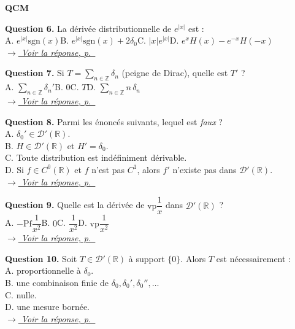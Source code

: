 \documentclass[12pt,a4paper,openany]{book}
\theoremstyle{definition}
\theoremstyle{plain}
\theoremstyle{remark}
\newenvironment{qcmblock}{%
	\begin{mdframed}[linewidth=0.5pt, linecolor=black!35,
		backgroundcolor=gray!5,
		skipabove=12pt, skipbelow=12pt,
		innerleftmargin=12pt, innerrightmargin=8pt,
		innertopmargin=8pt, innerbottommargin=8pt]%
		\noindent\textbf{\scshape QCM}\par\smallskip%
	}{%
	\end{mdframed}%
}
\newcommand{\navtoQCMRep}[2]{%
	\vspace{2pt}%
	\noindent\hfill{\small\itshape%
		\hyperlink{qcmrep:#1:q#2}{$\rightarrow$ Voir la réponse, p.~\pageref*{qcmrep:#1:q#2}}%
	}%
	\vspace{6pt}%
}
\begin{document}
\begin{qcmblock}
		\medskip
		\hypertarget{qcm:ch3:q6}{}\label{qcm:ch3:q6}
		\textbf{Question 6.} La dérivée distributionnelle de $e^{|x|}$ est :\\
		A. $e^{|x|}\mathrm{sgn}(x)$\quad B. $e^{|x|}\mathrm{sgn}(x) + 2\delta_0$\quad C. $|x|e^{|x|}$\quad D. $e^x H(x) - e^{-x}H(-x)$\\
		\navtoQCMRep{ch3}{6}
		
		\medskip
		\hypertarget{qcm:ch3:q7}{}\label{qcm:ch3:q7}
		\textbf{Question 7.} Si $T = \displaystyle\sum_{n \in \mathbb{Z}} \delta_n$ (peigne de Dirac), quelle est $T'$ ?\\
		A. $\displaystyle\sum_{n\in\mathbb{Z}}\delta_n'$\quad B. $0$\quad C. $T$\quad D. $\displaystyle\sum_{n\in\mathbb{Z}} n\,\delta_n$\\
		\navtoQCMRep{ch3}{7}
		
		\medskip
		\hypertarget{qcm:ch3:q8}{}\label{qcm:ch3:q8}
		\textbf{Question 8.} Parmi les énoncés suivants, lequel est \emph{faux} ?\\
		A. $\delta_0' \in \mathcal{D}'(\mathbb{R})$.\\
		B. $H \in \mathcal{D}'(\mathbb{R})$ et $H' = \delta_0$.\\
		C. Toute distribution est indéfiniment dérivable.\\
		D. Si $f \in C^0(\mathbb{R})$ et $f$ n'est pas $C^1$, alors $f'$ n'existe pas dans $\mathcal{D}'(\mathbb{R})$.\\
		\navtoQCMRep{ch3}{8}
		
		\medskip
		\hypertarget{qcm:ch3:q9}{}\label{qcm:ch3:q9}
		\textbf{Question 9.} Quelle est la dérivée de $\mathrm{vp}\dfrac{1}{x}$ dans $\mathcal{D}'(\mathbb{R})$ ?\\
		A. $-\mathrm{Pf}\dfrac{1}{x^2}$\quad B. $0$\quad C. $\dfrac{1}{x^2}$\quad D. $\mathrm{vp}\dfrac{1}{x^2}$\\
		\navtoQCMRep{ch3}{9}
		
		\medskip
		\hypertarget{qcm:ch3:q10}{}\label{qcm:ch3:q10}
		\textbf{Question 10.} Soit $T \in \mathcal{D}'(\mathbb{R})$ à support $\{0\}$. Alors $T$ est nécessairement :\\
		A. proportionnelle à $\delta_0$.\\
		B. une combinaison finie de $\delta_0, \delta_0', \delta_0'', \ldots$\\
		C. nulle.\\
		D. une mesure bornée.\\
		\navtoQCMRep{ch3}{10}
	\end{qcmblock}
\end{document}
